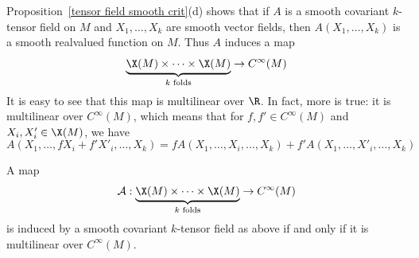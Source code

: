 Proposition~\ref{tensor field smooth crit}(d) shows that if $A$ is a smooth covariant $k$-tensor field on $M$ and $X_1,\dots,X_k$ are smooth vector fields, then $A(X_1,\dots,X_k)$ is a smooth realvalued function on $M$. Thus $A$ induces a map
\[\underbrace{\X(M)\times\cdots\times\X(M)}_{\text{$k$ folds}}\to C^\infty(M)\]
It is easy to see that this map is multilinear over $\R$. In fact, more is true: it is multilinear over $C^\infty(M)$, which means that for $f,f'\in C^\infty(M)$ and $X_i,X_i'\in\X(M)$, we have
\[A(X_1,\dots,fX_i+f'X'_i,\dots,X_k)=fA(X_1,\dots,X_i,\dots,X_k)+f'A(X_1,\dots,X'_i,\dots,X_k)\]
\begin{lemma}\label{tensor char}
A map
\begin{align}\label{tensor char-1}
\mathcal{A}:\underbrace{\X(M)\times\cdots\times\X(M)}_{\text{$k$ folds}}\to C^\infty(M)
\end{align}
is induced by a smooth covariant $k$-tensor field as above if and only if it is multilinear over $C^\infty(M)$.
\end{lemma}
